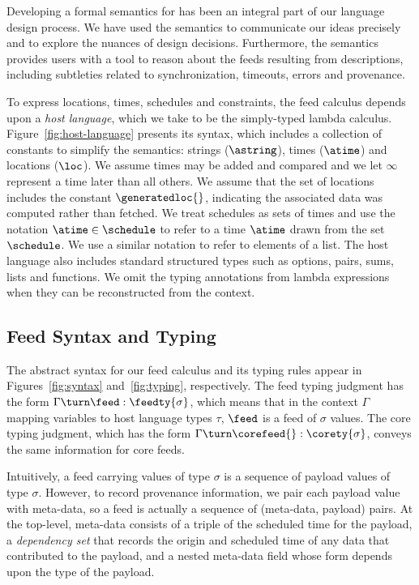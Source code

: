 
Developing a formal semantics for \padsd{} has been an integral part
of our language design process.  We have used the semantics to
communicate our ideas precisely and to explore the nuances of design
decisions. Furthermore, the semantics provides users with a tool to
reason about the feeds resulting from \padsd{} descriptions, including
subtleties related to synchronization, timeouts, errors and provenance.

To express locations, times, schedules and constraints, the feed calculus
depends upon a {\em host language}, which we take to be the
simply-typed lambda calculus.  Figure~\ref{fig:host-language} presents
its syntax, which includes a collection of constants to simplify the
semantics: strings ($\astring$), times ($\atime$) and locations
($\loc$).  We assume times may be added and 
compared and we let $\infty$ represent a time later than all others.
We assume that the set of locations includes the constant
$\generatedloc{}$, indicating the associated data was computed rather
than fetched.
We treat schedules as sets of times and use the notation $\atime
\in \schedule$ to refer to a time $\atime$ drawn from the set
$\schedule$.  We use a similar notation to refer to elements of a
list.  The host language also includes standard structured types such as
options, pairs, sums, lists and functions.
We omit the typing annotations from lambda expressions when they can
be reconstructed from the context.


\subsection{Feed Syntax and Typing}
The abstract syntax for our feed calculus and its typing rules appear
in Figures~\ref{fig:syntax} and~\ref{fig:typing}, respectively.  
The feed typing judgment has the form 
$\Gamma \turn \feed : \feedty{\sigma}$, 
which means that in the context $\Gamma$ mapping variables to host
language types $\tau$, $\feed$ is a feed of $\sigma$ values. 
The core typing judgment, which has the form 
$\Gamma \turn \corefeed{} : \corety{\sigma}$, conveys the same
information for core feeds.



Intuitively, a feed carrying values of type $\sigma$ is a sequence of
payload values of type $\sigma$.  However, to record provenance
information, we pair each payload value with meta-data, so a feed is
actually a sequence of (meta-data, payload) pairs.  At the top-level,
meta-data consists of a triple of the scheduled time for the payload,
a \textit{dependency set} that records the origin and scheduled time of any data
that contributed to the payload, and a nested meta-data field whose
form depends upon the type of the payload.

